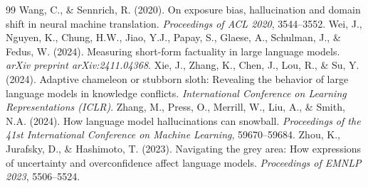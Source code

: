 \documentclass[11pt,a4paper,oneside]{report}
\begin{document}
\begin{thebibliography}{99}
 Wang, C., \& Sennrich, R. (2020). On exposure bias, hallucination and domain shift in neural machine translation. \emph{Proceedings of ACL 2020}, 3544--3552.
 Wei, J., Nguyen, K., Chung, H.W., Jiao, Y.J., Papay, S., Glaese, A., Schulman, J., \& Fedus, W. (2024). Measuring short-form factuality in large language models. \emph{arXiv preprint arXiv:2411.04368}.
 Xie, J., Zhang, K., Chen, J., Lou, R., \& Su, Y. (2024). Adaptive chameleon or stubborn sloth: Revealing the behavior of large language models in knowledge conflicts. \emph{International Conference on Learning Representations (ICLR)}.
 Zhang, M., Press, O., Merrill, W., Liu, A., \& Smith, N.A. (2024). How language model hallucinations can snowball. \emph{Proceedings of the 41st International Conference on Machine Learning}, 59670--59684.
 Zhou, K., Jurafsky, D., \& Hashimoto, T. (2023). Navigating the grey area: How expressions of uncertainty and overconfidence affect language models. \emph{Proceedings of EMNLP 2023}, 5506--5524.
\end{thebibliography}
\end{document}
